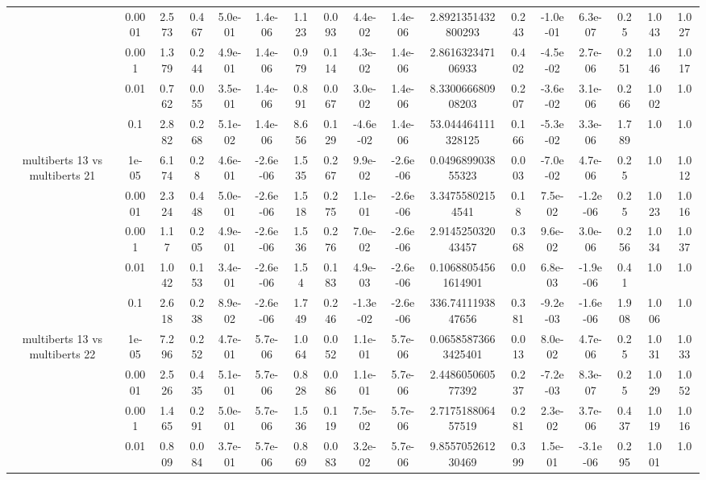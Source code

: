 \begin{tabular}{|c|c|c|c|c|c|c|c|c|c|c|c|c|c|c|c|c|}
 & 0.0001 & 2.573 & 0.467 & 5.0e-01 & 1.4e-06 & 1.123 & 0.093 & 4.4e-02 & 1.4e-06 & 2.8921351432800293 & 0.243 & -1.0e-01 & 6.3e-07 & 0.25 & 1.043 & 1.027 \\
 & 0.001 & 1.379 & 0.244 & 4.9e-01 & 1.4e-06 & 0.979 & 0.114 & 4.3e-02 & 1.4e-06 & 2.861632347106933 & 0.402 & -4.5e-02 & 2.7e-06 & 0.251 & 1.046 & 1.017 \\
 & 0.01 & 0.762 & 0.055 & 3.5e-01 & 1.4e-06 & 0.891 & 0.067 & 3.0e-02 & 1.4e-06 & 8.330066680908203 & 0.207 & -3.6e-02 & 3.1e-06 & 0.266 & 1.002 & 1.0 \\
 & 0.1 & 2.882 & 0.268 & 5.1e-02 & 1.4e-06 & 8.656 & 0.129 & -4.6e-02 & 1.4e-06 & 53.044464111328125 & 0.166 & -5.3e-02 & 3.3e-06 & 1.789 & 1.0 & 1.0 \\
\hline
\multirow{5}{*}{multiberts 13 vs multiberts 21} & 1e-05 & 6.174 & 0.28 & 4.6e-01 & -2.6e-06 & 1.535 & 0.267 & 9.9e-02 & -2.6e-06 & 0.049689903855323 & 0.003 & -7.0e-02 & 4.7e-06 & 0.25 & 1.0 & 1.012 \\
 & 0.0001 & 2.324 & 0.448 & 5.0e-01 & -2.6e-06 & 1.518 & 0.275 & 1.1e-01 & -2.6e-06 & 3.34755802154541 & 0.18 & 7.5e-02 & -1.2e-06 & 0.25 & 1.023 & 1.016 \\
 & 0.001 & 1.17 & 0.205 & 4.9e-01 & -2.6e-06 & 1.536 & 0.276 & 7.0e-02 & -2.6e-06 & 2.914525032043457 & 0.368 & 9.6e-02 & 3.0e-06 & 0.256 & 1.034 & 1.037 \\
 & 0.01 & 1.042 & 0.153 & 3.4e-01 & -2.6e-06 & 1.54 & 0.183 & 4.9e-03 & -2.6e-06 & 0.10688054561614901 & 0.0 & 6.8e-03 & -1.9e-06 & 0.41 & 1.0 & 1.0 \\
 & 0.1 & 2.618 & 0.238 & 8.9e-02 & -2.6e-06 & 1.749 & 0.246 & -1.3e-02 & -2.6e-06 & 336.7411193847656 & 0.381 & -9.2e-03 & -1.6e-06 & 1.908 & 1.006 & 1.0 \\
\hline
\multirow{5}{*}{multiberts 13 vs multiberts 22} & 1e-05 & 7.296 & 0.252 & 4.7e-01 & 5.7e-06 & 1.064 & 0.052 & 1.1e-01 & 5.7e-06 & 0.06585873663425401 & 0.013 & 8.0e-02 & 4.7e-06 & 0.25 & 1.031 & 1.033 \\
 & 0.0001 & 2.526 & 0.435 & 5.1e-01 & 5.7e-06 & 0.828 & 0.086 & 1.1e-01 & 5.7e-06 & 2.448605060577392 & 0.237 & -7.2e-03 & 8.3e-07 & 0.25 & 1.029 & 1.052 \\
 & 0.001 & 1.465 & 0.291 & 5.0e-01 & 5.7e-06 & 1.536 & 0.119 & 7.5e-02 & 5.7e-06 & 2.717518806457519 & 0.281 & 2.3e-02 & 3.7e-06 & 0.437 & 1.019 & 1.016 \\
 & 0.01 & 0.809 & 0.084 & 3.7e-01 & 5.7e-06 & 0.869 & 0.083 & 3.2e-02 & 5.7e-06 & 9.855705261230469 & 0.399 & 1.5e-01 & -3.1e-06 & 0.295 & 1.001 & 1.0 \\

\end{tabular}
